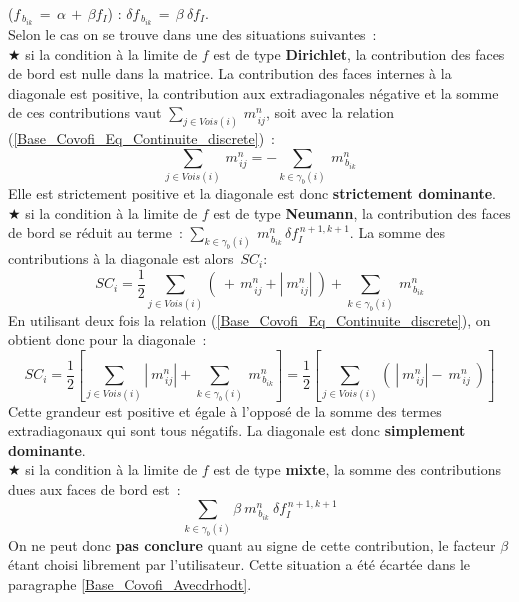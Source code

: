 \begin{itemize}
($f_{\,b_{ik}}\,=\,\alpha\,+\,\beta f_I$) : $\delta f_{\,b_{ik}}\,=\,\beta\
\delta f_I$.\\
Selon le cas on se trouve dans une des situations suivantes~:\\
\hspace*{1.cm} {\tiny$\bigstar$} si la condition \`{a} la limite de $f$ est de type
{\bf Dirichlet}, la contribution des faces de bord est nulle dans la matrice. La
contribution des faces internes \`a la diagonale est positive, la contribution
aux extradiagonales n\'egative et la somme de ces contributions vaut
$\sum\limits_{j\in Vois(i)}\,m_{\,ij}^n$, soit avec la relation
(\ref{Base_Covofi_Eq_Continuite_discrete})~:
$$\sum\limits_{j\in Vois(i)}\,m_{\,ij}^n=-\sum\limits_{k\in {\gamma_b(i)}}\
m_{\,{b}_{ik}}^n  $$ Elle est strictement positive et la diagonale est donc
{\bf strictement dominante}.\\
\hspace*{1.cm} {\tiny$\bigstar$} si la condition \`{a} la limite de $f$ est de type
{\bf Neumann}, la contribution des faces de bord se r\'{e}duit au terme~:
$
\sum\limits_{k\in {\gamma_b(i)}}\ m_{\,{b}_{ik}}^n \,\delta f_I^{\,n+1,k+1}
$.
La somme des contributions \`a la diagonale est alors~$SC_{i}$:
$$SC_{i}=\frac{1}{2}\sum\limits_{j\in Vois(i)}(\ +\,m_{\,ij}^n + |\ m_{\,ij}^n|\ )
+\sum\limits_{k\in {\gamma_b(i)}}\ m_{\,{b}_{ik}}^n $$
En utilisant deux fois la relation (\ref{Base_Covofi_Eq_Continuite_discrete}), on obtient donc pour la
diagonale~:
$$SC_{i}=\frac{1}{2}\left[\sum\limits_{j\in Vois(i)}|\ m_{\,ij}^n|
+\sum\limits_{k\in {\gamma_b(i)}}\
m_{\,{b}_{ik}}^n\right]=\frac{1}{2}\left[\sum\limits_{j\in Vois(i)}(\ |\ m_{\,ij}^n|-\ m_{\,ij}^n\ )\right]$$
Cette grandeur est positive et \'egale \`a l'oppos\'e de la somme des termes
extradiagonaux qui sont tous n\'egatifs. La diagonale est donc
{\bf simplement dominante}.\\
\hspace*{1.cm} {\tiny$\bigstar$} si la condition \`{a} la limite de $f$ est de type
{\bf mixte}, la somme des contributions dues aux faces de bord est~:\\
\begin{equation}
\sum\limits_{k \in \gamma_b(i)}\beta \ m_{\,{b}_{ik}}^n \ \delta f_I^{\,n+1,k+1}
\end{equation}
On ne peut donc {\bf pas conclure} quant au signe de cette contribution, le facteur
$\beta$ \'etant choisi librement par l'utilisateur. Cette situation a \'et\'e
\'ecart\'ee dans le paragraphe \ref{Base_Covofi_Avecdrhodt}.\\

\end{itemize}


